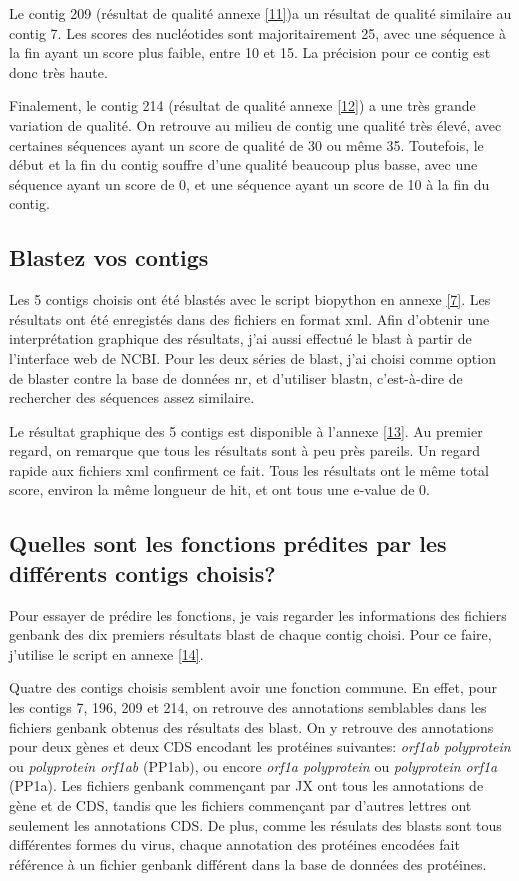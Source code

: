 \documentclass[11pt]{article} %
\begin{document}
Le contig 209 (résultat de qualité annexe \ref{11})a un résultat de qualité similaire au contig 7. Les scores des nucléotides 
sont majoritairement 25, avec une séquence à la fin ayant un score plus faible, entre 10 et 15. La précision pour ce contig est
donc très haute.

Finalement, le contig 214 (résultat de qualité annexe \ref{12}) a une très grande variation de qualité. On retrouve au milieu
de contig une qualité très élevé, avec certaines séquences ayant un score de qualité de 30 ou même 35. Toutefois, le début et
la fin du contig souffre d'une qualité beaucoup plus basse, avec une séquence ayant un score de 0, et une séquence ayant un score
de 10 à la fin du contig.

\subsection[Blast des contigs]{Blastez vos contigs}

Les 5 contigs choisis ont été blastés avec le script biopython en annexe \ref{7}. Les résultats ont été enregistés dans des
fichiers en format xml. Afin d'obtenir une interprétation graphique des résultats, j'ai aussi effectué le blast à partir de
l'interface web de NCBI. Pour les deux séries de blast, j'ai choisi comme option de blaster contre la base de données nr, 
et d'utiliser blastn, c'est-à-dire de rechercher des séquences assez similaire.

Le résultat graphique des 5 contigs est disponible à l'annexe \ref{13}. Au premier regard, on remarque que tous les résultats
sont à peu près pareils. Un regard rapide aux fichiers xml confirment ce fait. Tous les résultats ont le même total score,
environ la même longueur de hit, et ont tous une e-value de 0.

\subsection[Fonctions prédites des contigs]{Quelles sont les fonctions prédites par les différents contigs choisis?}

Pour essayer de prédire les fonctions, je vais regarder les informations des fichiers genbank des dix premiers résultats
blast de chaque contig choisi. Pour ce faire, j'utilise le script en annexe \ref{14}.

Quatre des contigs choisis semblent avoir une fonction commune. En effet, pour les contigs 7, 196, 209 et 214, on retrouve
des annotations semblables dans les fichiers genbank obtenus des résultats des blast. On y retrouve des annotations pour deux
gènes et deux CDS encodant les protéines suivantes: \emph{orf1ab polyprotein} ou \emph{polyprotein orf1ab} (PP1ab), ou encore
\emph{orf1a polyprotein} ou \emph{polyprotein orf1a} (PP1a). Les fichiers genbank commençant par JX ont tous les annotations
de gène et de CDS, tandis que les fichiers commençant par d'autres lettres ont seulement les annotations CDS. De plus,
comme les résulats des blasts sont tous différentes formes du virus, chaque annotation des protéines encodées fait référence
à un fichier genbank différent dans la base de données des protéines.
\end{document}
